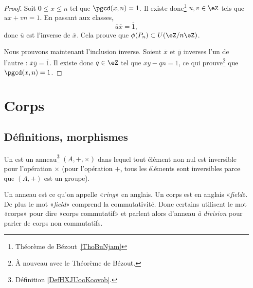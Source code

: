 \begin{proof}
	Soit \( 0\leq x\leq n\) tel que \( \pgcd(x,n)=1\). Il existe donc\footnote{Théorème de Bézout~\ref{ThoBuNjam}} \( u,v\in\eZ\) tels que \( ux+vn=1\). En passant aux classes,
	\begin{equation}
		\overline u\overline x=\overline 1,
	\end{equation}
	donc \( \overline u\) est l'inverse de \( \overline x\). Cela prouve que \( \phi(P_n)\subset U(\eZ/n\eZ)\).

	Nous prouvons maintenant l'inclusion inverse. Soient \( \overline x\) et \( \overline y\) inverses l'un de l'autre : \( \overline x\overline y=\overline 1\). Il existe donc \( q\in\eZ\) tel que \( xy-qn=1\), ce qui prouve\footnote{À nouveau avec le Théorème de Bézout.} que \( \pgcd(x,n)=1\).
\end{proof}

\section{Corps}

\subsection{Définitions, morphismes}

\begin{definition}  \label{DefTMNooKXHUd}
	Un  est un anneau\footnote{Définition \ref{DefHXJUooKoovob}.} \( (A, +,\times)\) dans lequel tout élément non nul est inversible pour l'opération \( \times\) (pour l'opération \( +\), tous les éléments sont inversibles parce que \( (A,+)\) est un groupe).
\end{definition}

\begin{remark}      \label{REMooYRNUooYgBBKF}
	Un anneau est ce qu'on appelle «\emph{ring}» en anglais. Un corps est en anglais «\emph{field}». De plus le mot «\emph{field}» comprend la commutativité. Donc certains utilisent le mot «corps» pour dire «corps commutatif» et parlent alors d'anneau \emph{à division} pour parler de corps non commutatifs.
\end{remark}

